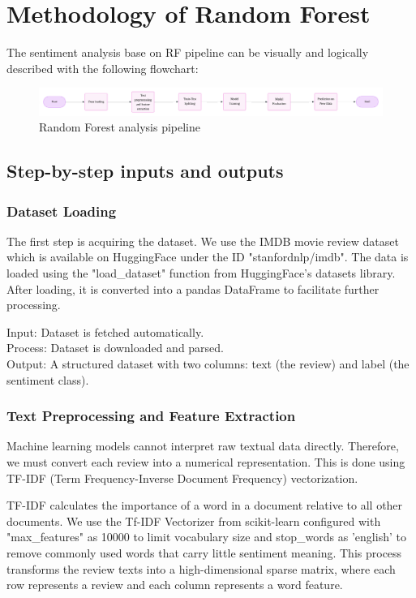 \section{Methodology of Random Forest}

The sentiment analysis base on RF pipeline can be visually and logically described with the following flowchart:

\begin{figure}[ht]
    \centering
    \includegraphics[width=1\textwidth]{pics/rf_steps.png}
    \caption{Random Forest analysis pipeline}
\end{figure}

\subsection{Step-by-step inputs and outputs}

\subsubsection*{Dataset Loading}
The first step is acquiring the dataset. We use the IMDB movie review dataset which is available on HuggingFace under the ID "stanfordnlp/imdb". The data is loaded using the "load\_dataset" function from HuggingFace's datasets library. After loading, it is converted into a pandas DataFrame to facilitate further processing.

Input: Dataset is fetched automatically.\\
Process: Dataset is downloaded and parsed.\\
Output: A structured dataset with two columns: text (the review) and label (the sentiment class).

\subsubsection*{Text Preprocessing and Feature Extraction}
Machine learning models cannot interpret raw textual data directly. Therefore, we must convert each review into a numerical representation. This is done using TF-IDF (Term Frequency-Inverse Document Frequency) vectorization.

TF-IDF calculates the importance of a word in a document relative to all other documents. We use the Tf-IDF Vectorizer from scikit-learn configured with "max\_features" as 10000 to limit vocabulary size and stop\_words as 'english' to remove commonly used words that carry little sentiment meaning.
This process transforms the review texts into a high-dimensional sparse matrix, where each row represents a review and each column represents a word feature.

